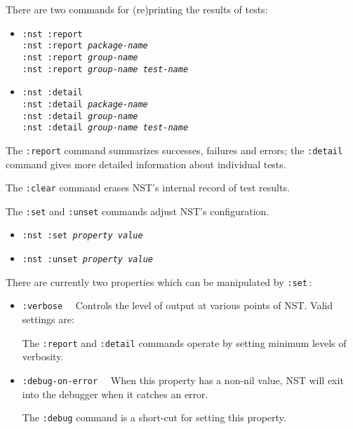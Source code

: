 There are two commands for (re)printing the results of tests:
\begin{itemize}
\item\texttt{:nst :report}
\\ \texttt{:nst :report {\itshape package-name}}
\\ \texttt{:nst :report {\itshape group-name}}
\\ \texttt{:nst :report {\itshape group-name} {\itshape test-name}}
\item\texttt{:nst :detail}
\\ \texttt{:nst :detail {\itshape package-name}}
\\ \texttt{:nst :detail {\itshape group-name}}
\\ \texttt{:nst :detail {\itshape group-name} {\itshape test-name}}
\end{itemize}
The \texttt{:report} command summarizes successes, failures and
errors; the \texttt{:detail} command gives more detailed information
about individual tests.

The \texttt{:clear} command erases NST's internal record of test
results.

The \texttt{:set} and \texttt{:unset} commands adjust NST's
configuration.
\begin{itemize}
\item\texttt{:nst :set {\itshape property} {\itshape value}}
\item\texttt{:nst :unset {\itshape property} {\itshape value}}
\end{itemize}
There are currently two properties which can be manipulated by \texttt{:set}\,:
\begin{itemize}
\item\texttt{:verbose}~~ Controls the
  level of output at various points of NST.  Valid settings are:

  The \texttt{:report} and \texttt{:detail} commands operate by
  setting minimum levels of verbosity.

\item\texttt{:debug-on-error}~~
  When this property has a non-nil value, NST will exit into the
  debugger when it catches an error.

  The \texttt{:debug} command is a short-cut for setting this
  property.
\end{itemize}

